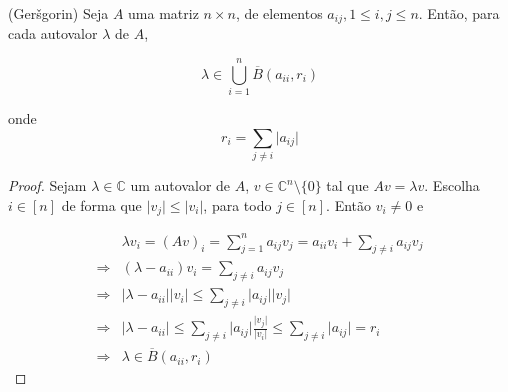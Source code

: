 \begin{teorema}
(Ger\v{s}gorin) \cite{horn2012matrix} Seja $A$ uma matriz $n \times n$, de elementos $a_{ij}, 1\leq i,j \leq n$. Então, para cada autovalor $\lambda$ de $A$,

$$ \lambda \in \bigcup_{i = 1}^n \overline{B}(a_{ii}, r_i) $$

onde $$r_i = \sum_{j \neq i} \vert a_{ij} \vert$$
\end{teorema}
\begin{proof}
Sejam $\lambda \in \mathbb{C}$ um autovalor de $A$, $v \in \mathbb{C}^{n} \setminus \lbrace 0 \rbrace$ tal que $Av = \lambda v$. Escolha $i \in [n]$ de forma que $\vert v_j \vert \leq \vert v_i \vert$, para todo $j \in [n]$. Então $v_i \neq 0$ e

\begin{subequations}
\begin{align*}
& \lambda v_i = (Av)_i
= \sum_{j = 1}^n a_{ij}v_j
= a_{ii}v_i + \sum_{j \neq i} a_{ij}v_j
\\ \Rightarrow &
(\lambda - a_{ii})v_i = \sum_{j \neq i} a_{ij}v_j
\\ \Rightarrow &
\vert \lambda - a_{ii} \vert \vert v_i \vert \leq \sum_{j \neq i} \vert a_{ij} \vert \vert v_j \vert
\\ \Rightarrow &
\vert \lambda - a_{ii} \vert \leq
\sum_{j \neq i} \vert a_{ij} \vert \frac{ \vert v_j \vert}{\vert v_i \vert}
\leq \sum_{j \neq i} \vert a_{ij} \vert = r_i
\\ \Rightarrow &
\lambda \in \overline{B}(a_{ii}, r_i)
\end{align*}
\end{subequations}
\end{proof}

